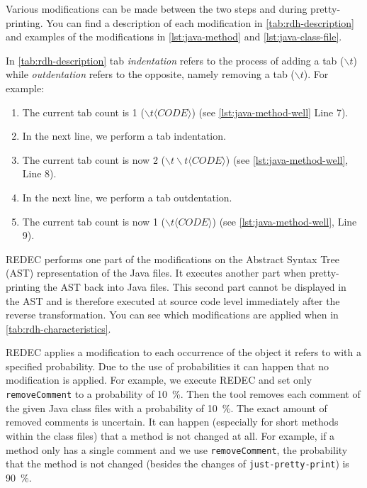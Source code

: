 \documentclass[%
class=scrreprt,
chapterprefix=false,%
open=right,%
twoside=false,%
paper=a4,%
logofile={Logo\_zentral\_farbig\_EN.png},%
thesistype=master,%
UKenglish,%
]{se2thesis}
\theoremstyle{definition}
\newcommand{\rdh}{REDEC\xspace}
\newcommand{\none}{just-pretty-print\xspace} %
\newcommand{\nonet}{\texttt{\none}\xspace} %
\begin{document}
	
	Various modifications can be made between the two steps and during pretty-printing. You can find a description of each modification in \autoref{tab:rdh-description} and examples of the modifications in \autoref{lst:java-method} and \autoref{lst:java-class-file}.
	
	In \autoref{tab:rdh-description} tab \textit{indentation} refers to the process of adding a tab ($\backslash t$) while \textit{outdentation} refers to the opposite, namely removing a tab ($\backslash t$). 
	For example:
	\begin{enumerate}
		\item The current tab count is 1 ($\backslash t \langle CODE \rangle$) (see \autoref{lst:java-method-well} Line 7).
		\item In the next line, we perform a tab indentation.
		\item The current tab count is now 2 ($\backslash t \backslash t \langle CODE \rangle $) (see \autoref{lst:java-method-well}, Line 8).
		\item In the next line, we perform a tab outdentation.
		\item The current tab count is now 1 ($\backslash t \langle CODE \rangle $) (see \autoref{lst:java-method-well}, Line 9).
	\end{enumerate}
		
	\rdh performs one part of the modifications on the Abstract Syntax Tree (AST) representation of the Java files. It executes another part when pretty-printing the AST back into Java files. This second part cannot be displayed in the AST and is therefore executed at source code level immediately after the reverse transformation. You can see which modifications are applied when in \autoref{tab:rdh-characteristics}.
	
	\rdh applies a modification to each occurrence of the object it refers to with a specified probability. Due to the use of probabilities it can happen that no modification is applied. For example, we execute \rdh and set only \texttt{removeComment} to a probability of 10~\%. Then the tool removes each comment of the given Java class files with a probability of 10~\%. The exact amount of removed comments is uncertain. It can happen (especially for short methods within the class files) that a method is not changed at all. For example, if a method only has a single comment and we use \texttt{removeComment}, the probability that the method is not changed (besides the changes of \nonet) is 90~\%.
\end{document}

